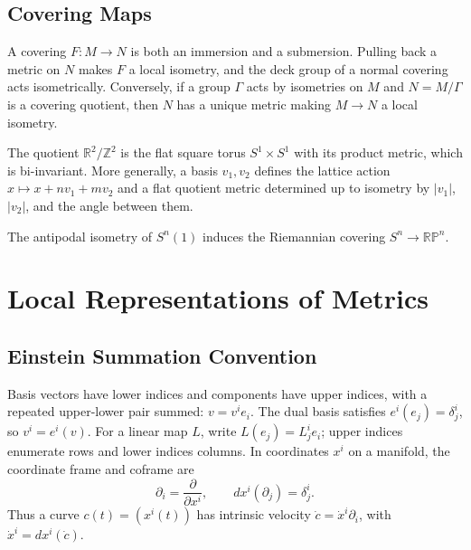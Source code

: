 \subsection{Covering Maps}

\begin{remark}
  \label{rem:pet-ch1-covering-metric}
  \leanok
  A covering $F:M\to N$ is both an immersion and a submersion. Pulling back a
  metric on $N$ makes $F$ a local isometry, and the deck group of a normal
  covering acts isometrically. Conversely, if a group $\Gamma$ acts by
  isometries on $M$ and $N=M/\Gamma$ is a covering quotient, then $N$ has a
  unique metric making $M\to N$ a local isometry.
\end{remark}

\begin{example}
  \label{ex:pet-ch1-flat-torus}
  \leanok
  The quotient $\mathbb{R}^2/\mathbb{Z}^2$ is the flat square torus
  $S^1\times S^1$ with its product metric, which is bi-invariant. More
  generally, a basis $v_1,v_2$ defines the lattice action
  $x\mapsto x+nv_1+mv_2$ and a flat quotient metric determined up to isometry
  by $|v_1|$, $|v_2|$, and the angle between them.
\end{example}

\begin{example}
  \label{ex:pet-ch1-real-projective-space}
  \leanok
  The antipodal isometry of $S^n(1)$ induces the Riemannian covering
  $S^n\to\mathbb{RP}^n$.
\end{example}

\section{Local Representations of Metrics}

\subsection{Einstein Summation Convention}

\begin{convention}
  \label{conv:pet-ch1-einstein-summation}
  \leanok
  Basis vectors have lower indices and components have upper indices, with a
  repeated upper-lower pair summed:
  $v=v^ie_i$. The dual basis satisfies $e^i(e_j)=\delta^i_j$, so
  $v^i=e^i(v)$. For a linear map $L$, write
  $L(e_j)=L^i_j e_i$; upper indices enumerate rows and lower indices columns.
  In coordinates $x^i$ on a manifold, the coordinate frame and coframe are
  \[
    \partial_i=\frac{\partial}{\partial x^i},\qquad
    dx^i(\partial_j)=\delta^i_j.
  \]
  Thus a curve $c(t)=(x^i(t))$ has intrinsic velocity
  $\dot c=\dot x^i\partial_i$, with $\dot x^i=dx^i(\dot c)$.
\end{convention}

